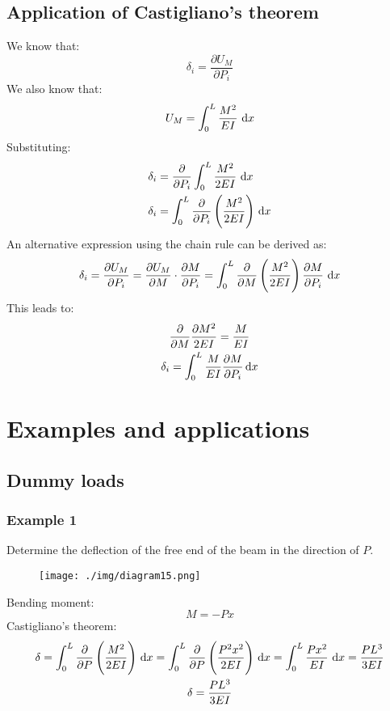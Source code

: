 \subsection{Application of Castigliano's theorem}
We know that:
\begin{equation}
  \delta_i = \frac{\partial U_M}{\partial P_i}
\end{equation}
We also know that:
\begin{equation}
  U_M = \int_0^L \frac{M^2}{EI}\, \dif x
\end{equation}
Substituting:
\begin{align}
  \delta_i & = \frac{\partial}{\partial P_i} \int_0^L \frac{M^2}{2EI} \, \dif x              \\
  \delta_i & = \int_0^L \frac{\partial}{\partial P_i} \left(\frac{M^2}{2EI}\right) \, \dif x
\end{align}
An alternative expression using the chain rule can be derived as:
\begin{gather}
  \delta_i = \frac{\partial U_M}{\partial P_i} = \frac{\partial U_M}{\partial M} \cdot \frac{\partial M}{\partial P_i} = \int_0^L \frac{\partial}{\partial M} \left(\frac{M^2}{2EI}\right)\frac{\partial M}{\partial P_i} \, \dif x
\end{gather}
This leads to:
\begin{gather}
  \frac{\partial}{\partial M} \frac{\partial M^2}{2EI} = \frac{M}{EI}\\
  \delta_i = \int_0^L \frac{M}{EI} \frac{\partial M}{\partial P_i}\dif x
\end{gather}
\section{Examples and applications}
\subsection{Dummy loads}
\subsubsection{Example 1}
Determine the deflection of the free end of the beam in the direction of $P$.
\begin{figure}[H]
  \centering
  \texttt{[image: ./img/diagram15.png]}
  \caption{}
\end{figure}
Bending moment:
\begin{equation}
  M = -P x
\end{equation}
Castigliano's theorem:
\begin{gather}
  \delta = \int_0^L \frac{\partial}{\partial P} \left(\frac{M^2}{2EI}\right) \, \dif x = \int_0^L \frac{\partial }{\partial P} \left(\frac{P^2 x^2}{2EI}\right)\, \dif x = \int_0^L \frac{Px^2}{EI} \, \dif x = \frac{PL^3}{3EI}\\
  \delta = \frac{PL^3}{3EI}
\end{gather}
